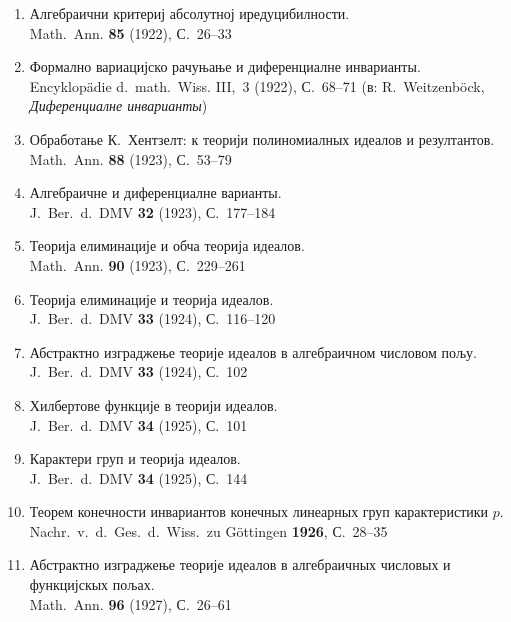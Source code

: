 \documentclass[11pt]{article}
\newcommand{\foreign}[1]{#1}
\begin{document}
\begin{enumerate}[label={\small\arabic*.},leftmargin=2em,itemsep=0.3em]
\item Алгебраични критериј абсолутној иредуцибилности.\\
\foreign{Math.\ Ann.} \textbf{85} (1922), С.~26--33

\item Формално вариацијско рачуњање и диференциалне инварианты.\\
\foreign{Encyklopädie d.\ math.\ Wiss.} III,\ 3 (1922), С.~68--71 (в:
\foreign{R.\ Weitzenböck}, \textit{Диференциалне инварианты})

\item Обработање К.\ Хентзелт: к теорији полиномиалных идеалов и резултантов.\\
\foreign{Math.\ Ann.} \textbf{88} (1923), С.~53--79

\item Алгебраичне и диференциалне варианты.\\
\foreign{J.\ Ber.\ d.\ DMV} \textbf{32} (1923), С.~177--184

\item Теорија елиминације и обча теорија идеалов.\\
\foreign{Math.\ Ann.} \textbf{90} (1923), С.~229--261

\item Теорија елиминације и теорија идеалов.\\
\foreign{J.\ Ber.\ d.\ DMV} \textbf{33} (1924), С.~116--120

\item Абстрактно изграджење теорије идеалов в алгебраичном числовом пољу.\\
\foreign{J.\ Ber.\ d.\ DMV} \textbf{33} (1924), С.~102

\item Хилбертове функције в теорији идеалов.\\
\foreign{J.\ Ber.\ d.\ DMV} \textbf{34} (1925), С.~101

\item Карактери груп и теорија идеалов.\\
\foreign{J.\ Ber.\ d.\ DMV} \textbf{34} (1925), С.~144

\item Теорем конечности инвариантов конечных линеарных груп карактеристики $p$.\\
\foreign{Nachr.\ v.\ d.\ Ges.\ d.\ Wiss.\ zu Göttingen} \textbf{1926}, С.~28--35

\item Абстрактно изграджење теорије идеалов в алгебраичных числовых и функцијскых пољах.\\
\foreign{Math.\ Ann.} \textbf{96} (1927), С.~26--61


\end{enumerate}
\end{document}

